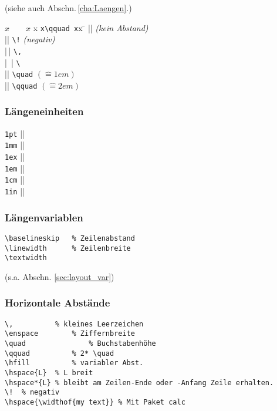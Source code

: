 \columnbreak
{} \label{sec:abstaende}
(siehe auch Abschn.\,\ref{cha:Laengen}.)
%
\begin{tabbing}
$x\qquad x$	x	\= \lstinline|x\qquad x|x	\= \kill
%
||				\> 										\> {\small \emph{(kein Abstand)}} 	\\
|\!|			\> \verb|\!|					\> {\small \emph{(negativ)}} \\
|\,|			\> \verb|\,|					\>  \\
|\ |			\> \lstinline|\ |			\> 	\\
|\quad |	\> \lstinline|\quad|	\> $(\hat = 1em)$	\\
|\qquad |	\> \lstinline|\qquad|	\> $(\hat = 2em)$
\end{tabbing}
%
\subsubsection*{Läng\-en\-ein\-hei\-ten}
\vspace{-0.7\baselineskip}
\begin{tabbing}
\lstinline|1pt| |\hspace{1pt}|\\
\lstinline|1mm| |\hspace{1mm}|\\
\lstinline|1ex| |\hspace{1ex}|\\
\lstinline|1em| |\hspace{1em}|\\
\lstinline|1cm| |\hspace{1cm}|\\
\lstinline|1in| |\hspace{1in}|
\end{tabbing}

\subsubsection*{Läng\-en\-va\-ri\-ab\-len}
\vspace{-0.7\baselineskip}
\begin{lstlisting}
\baselineskip	% Zeilenabstand
\linewidth 		% Zeilenbreite
\textwidth		
\end{lstlisting}
(s.a. Abschn. \ref{sec:layout_var})

\negAbstand
%
\subsubsection*{Horizontale Ab\-stän\-de}
\vspace{-0.7\baselineskip}
\begin{lstlisting}
\,			% kleines Leerzeichen
\enspace		% Ziffernbreite
\quad				% Buchstabenhöhe
\qquad			% 2* \quad
\hfill			% variabler Abst.
\hspace{L}	% L breit
\hspace*{L}	% bleibt am Zeilen-Ende oder -Anfang Zeile erhalten.
\!	% negativ
\hspace{\widthof{my text}} % Mit Paket calc
\end{lstlisting}


